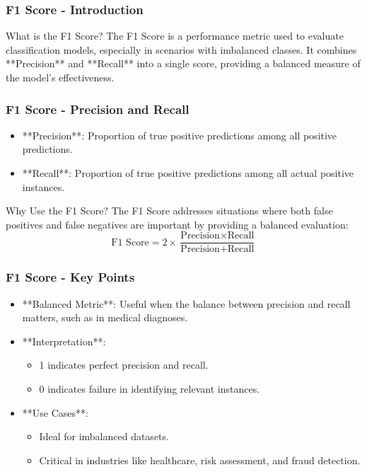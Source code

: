 \documentclass[aspectratio=169]{beamer}
\begin{document}
\begin{frame}[fragile]
    \frametitle{F1 Score - Introduction}
    \begin{block}{What is the F1 Score?}
        The F1 Score is a performance metric used to evaluate classification models, especially in scenarios with imbalanced classes.
        It combines **Precision** and **Recall** into a single score, providing a balanced measure of the model's effectiveness.
    \end{block}
\end{frame}

\begin{frame}[fragile]
    \frametitle{F1 Score - Precision and Recall}
    \begin{itemize}
        \item **Precision**: Proportion of true positive predictions among all positive predictions.
        \item **Recall**: Proportion of true positive predictions among all actual positive instances.
    \end{itemize}
    \begin{block}{Why Use the F1 Score?}
        The F1 Score addresses situations where both false positives and false negatives are important by providing a balanced evaluation:
        \[
        \text{F1 Score} = 2 \times \frac{\text{Precision} \times \text{Recall}}{\text{Precision} + \text{Recall}}
        \]
    \end{block}
\end{frame}

\begin{frame}[fragile]
    \frametitle{F1 Score - Key Points}
    \begin{itemize}
        \item **Balanced Metric**: Useful when the balance between precision and recall matters, such as in medical diagnoses.
        \item **Interpretation**: 
            \begin{itemize}
                \item 1 indicates perfect precision and recall.
                \item 0 indicates failure in identifying relevant instances.
            \end{itemize}
        \item **Use Cases**: 
            \begin{itemize}
                \item Ideal for imbalanced datasets.
                \item Critical in industries like healthcare, risk assessment, and fraud detection.
            \end{itemize}
    \end{itemize}
\end{frame}
\end{document}
